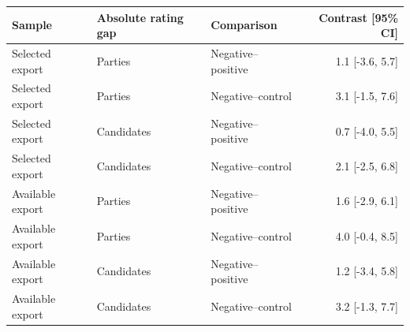 \begin{tabular}{lllr}
\toprule
Sample & Absolute rating gap & Comparison & Contrast [95\% CI] \\
\midrule
Selected export & Parties & Negative--positive & 1.1 [-3.6, 5.7] \\
Selected export & Parties & Negative--control & 3.1 [-1.5, 7.6] \\
Selected export & Candidates & Negative--positive & 0.7 [-4.0, 5.5] \\
Selected export & Candidates & Negative--control & 2.1 [-2.5, 6.8] \\
Available export & Parties & Negative--positive & 1.6 [-2.9, 6.1] \\
Available export & Parties & Negative--control & 4.0 [-0.4, 8.5] \\
Available export & Candidates & Negative--positive & 1.2 [-3.4, 5.8] \\
Available export & Candidates & Negative--control & 3.2 [-1.3, 7.7] \\
\bottomrule
\end{tabular}

